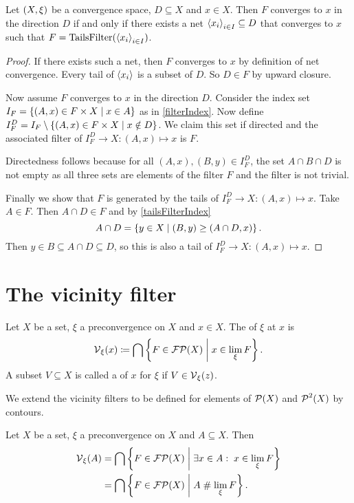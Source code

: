 \begin{lemma}
Let $\left( X,\xi \right)$ be a convergence space, $D\subseteq X$ and $x\in X$. Then $F$ converges to $x$ in the direction $D$ \textup{if and only if} there exists a net $\left\langle x_i \right\rangle_{i\in I}\subseteq D$ that converges to $x$ such that $F = \operatorname{TailsFilter}(\left\langle x_i \right\rangle_{i\in I})$.
\end{lemma}
\begin{proof}
If there exists such a net, then $F$ converges to $x$ by definition of net convergence. Every tail of $\left\langle x_i \right\rangle$ is a subset of $D$. So $D\in F$ by upward closure.

Now assume $F$ converges to $x$ in the direction $D$. Consider the index set $I_F = \left\{ (A,x)\in F\times X \;\middle|\; x\in A \right\}$ as in \ref{filterIndex}. Now define $I_F^D = I_F\setminus\left\{ (A,x)\in F\times X \;\middle|\; x\notin D \right\}$. We claim this set if directed and the associated filter of $I_F^D \to X: (A,x) \mapsto x$ is $F$.

Directedness follows because for all $(A,x), (B,y)\in I_F^D$, the set $A\cap B\cap D$ is not empty as all three sets are elements of the filter $F$ and the filter is not trivial.

Finally we show that $F$ is generated by the tails of $I_F^D \to X: (A,x) \mapsto x$. Take $A\in F$. Then $A\cap D\in F$ and by \ref{tailsFilterIndex}
\[ A\cap D = \left\{ y\in X \;\middle|\; (B,y) \geq (A\cap D,x) \right\}. \]
Then $y\in B\subseteq A\cap D \subseteq D$, so this is also a tail of $I_F^D \to X: (A,x) \mapsto x$.
\end{proof}

\section{The vicinity filter}
\begin{definition}
Let $X$ be a set, $\xi$ a preconvergence on $X$ and $x\in X$. The  of $\xi$ at $x$ is
\[ \operatorname{\mathcal{V}}_\xi(x) \coloneqq \bigcap \left\{ F\in \operatorname{\mathcal{FP}}(X) \;\middle|\; x\in \lim_\xi F \right\}. \]
A subset $V\subseteq X$ is called a  of $x$ for $\xi$ if $V\in \operatorname{\mathcal{V}}_\xi(z)$.

We extend the vicinity filters to be defined for elements of $\operatorname{\mathcal{P}}(X)$ and $\operatorname{\mathcal{P}}^2(X)$ by contours.
\end{definition}

\begin{lemma}
Let $X$ be a set, $\xi$ a preconvergence on $X$ and $A\subseteq X$. Then
\begin{align*}
\operatorname{\mathcal{V}}_\xi(A) &= \bigcap \left\{ F\in \operatorname{\mathcal{FP}}(X) \;\middle|\; \exists x\in A: \; x\in \lim_\xi F \right\} \\
&= \bigcap \left\{ F\in \operatorname{\mathcal{FP}}(X) \;\middle|\; A \mathrel{\#} \lim_\xi F \right\}.
\end{align*}
\end{lemma}

